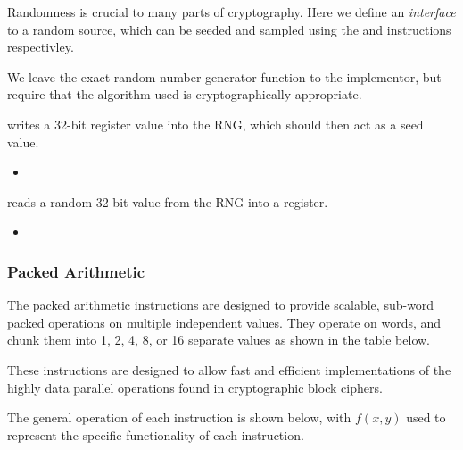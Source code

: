 Randomness is crucial to many parts of cryptography. Here we define an 
{\em interface} to a random source, which can be seeded and sampled using
the  and  instructions respectivley.

We leave the exact random number generator function to the implementor,
but require that the algorithm used is cryptographically appropriate.

{\iencrseedcr}
{
 writes a 32-bit register value into the RNG, which should
then act as a seed value.
}{
\begin{itemize}
\item {}
\end{itemize}
}{}

{\iencrsampcr}
{
 reads a random 32-bit value from the RNG into a register.
}{
\begin{itemize}
\item {}
\end{itemize}
}{}


\subsubsection{Packed Arithmetic}
\label{sec:packed-arithmetic-instructions}

The packed arithmetic instructions are designed to provide scalable, sub-word
packed operations on multiple independent values. They operate on words, and
chunk them into 1, 2, 4, 8, or 16 separate values as shown in the table
below.

These instructions are designed to allow fast and efficient implementations
of the highly data parallel operations found in cryptographic block ciphers.

The general operation of each instruction is shown below, with $f(x,y)$
used to represent the specific functionality of each instruction.

